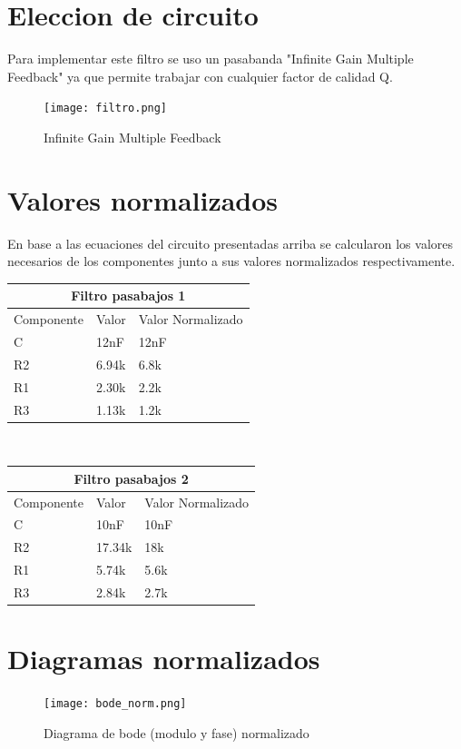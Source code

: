 \documentclass[11pt]{diazessay} %
\begin{document}
\newpage
\section*{Eleccion de circuito}
Para implementar este filtro se uso un pasabanda "Infinite Gain Multiple Feedback" ya que permite trabajar con cualquier factor de calidad Q.
\begin{figure}[h]
\centering
	\texttt{[image: filtro.png]}
\caption{Infinite Gain Multiple Feedback}
\end{figure}

\newpage
\section*{Valores normalizados}
En base a las ecuaciones del circuito presentadas arriba se calcularon los valores necesarios de los componentes junto a sus valores
normalizados respectivamente.\\
\break
\begin{tabular}{ |p{2cm}||p{2cm}|p{6cm}|  }
 \hline
 \multicolumn{3}{|c|}{Filtro pasabajos 1} \\
 \hline
 Componente&Valor&Valor Normalizado\\
 \hline
 C  & 12nF & 12nF\\
 R2  & 6.94k & 6.8k\\
 R1  & 2.30k & 2.2k\\
 R3  & 1.13k & 1.2k\\
 \hline
\end{tabular}\\
\break
\break
\begin{tabular}{ |p{2cm}||p{2cm}|p{6cm}|  }
 \hline
 \multicolumn{3}{|c|}{Filtro pasabajos 2} \\
 \hline
 Componente&Valor&Valor Normalizado\\
 \hline
 C  & 10nF & 10nF\\
 R2  & 17.34k & 18k\\
 R1  & 5.74k & 5.6k\\
 R3  & 2.84k & 2.7k\\
 \hline
\end{tabular}

\newpage
\section*{Diagramas normalizados}
\begin{figure}[h]
\centering
	\texttt{[image: bode\_norm.png]}
\caption{Diagrama de bode (modulo y fase) normalizado}
\end{figure}
\end{document}
